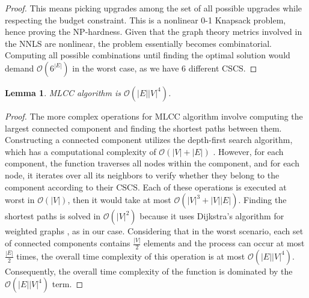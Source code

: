 \documentclass[lettersize,journal]{IEEEtran}
\newtheorem{lemma}{Lemma}
\begin{document}
\begin{proof}
This means picking upgrades among the set of all possible upgrades while respecting the budget constraint. This is a nonlinear 0-1 Knapsack problem, hence proving the NP-hardness. Given that the graph theory metrics involved in the NNLS are nonlinear, the problem essentially becomes combinatorial. Computing all possible combinations until finding the optimal solution would demand $\mathcal{O}(6^{|E|})$ in the worst case, as we have 6 different CSCS. 

\end{proof}

\begin{lemma}
    MLCC algorithm is $\mathcal{O}(|E||V|^{4})$.
\end{lemma}

\begin{proof}
    The more complex operations for MLCC algorithm involve computing the largest connected component and finding the shortest paths between them. Constructing a connected component utilizes the depth-first search algorithm, which has a computational complexity of $\mathcal{O}(|V|+|E|)$ \cite{cormen2022introduction}. However, for each component, the function traverses all nodes within the component, and for each node, it iterates over all its neighbors to verify whether they belong to the component according to their CSCS. Each of these operations is executed at worst in $\mathcal{O}(|V|)$, then it would take at most $\mathcal{O}(|V|^{3}+|V||E|)$. Finding the shortest paths is solved in $\mathcal{O}(|V|^{2})$ because it uses Dijkstra's algorithm for weighted graphs \cite{barbehenn1998note}, as in our case. Considering that in the worst scenario, each set of connected components contains $\frac{|V|}{2}$ elements and the process can occur at most $\frac{|E|}{2}$ times, the overall time complexity of this operation is at most $\mathcal{O}(|E||V|^{4})$. Consequently, the overall time complexity of the function is dominated by the $\mathcal{O}(|E||V|^{4})$ term.
\end{proof}
\end{document}
